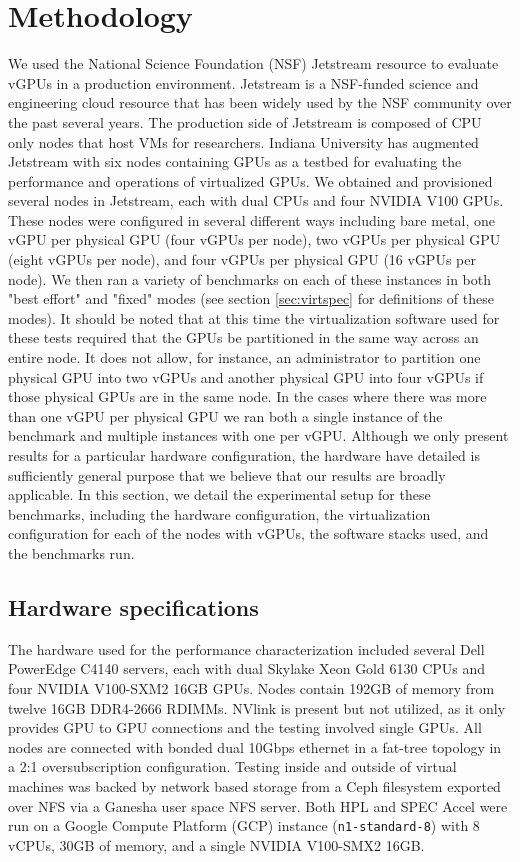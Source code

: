 \documentclass[acmtog, authorversion]{acmart}
\begin{document}
\section{Methodology} \label{sec:method}
We used the National Science Foundation (NSF) Jetstream resource \cite{jetstream1, jetstream2} to evaluate vGPUs in a production environment. Jetstream is a NSF-funded science and engineering cloud resource that has been widely used by the NSF community over the past several years. The production side of Jetstream is composed of CPU only nodes that host VMs for researchers. Indiana University has augmented Jetstream with six nodes containing GPUs as a testbed for evaluating the performance and operations of virtualized GPUs. We obtained and provisioned several nodes in Jetstream, each with dual CPUs and four NVIDIA V100 GPUs. These nodes were configured in several different ways including bare metal, one vGPU per physical GPU (four vGPUs per node), two vGPUs per physical GPU (eight vGPUs per node), and four vGPUs per physical GPU (16 vGPUs per node). We then ran a variety of benchmarks on each of these instances in both "best effort" and "fixed" modes (see section \ref{sec:virtspec} for definitions of these modes). It should be noted that at this time the virtualization software used for these tests required that the GPUs be partitioned in the same way across an entire node. It does not allow, for instance, an administrator to partition one physical GPU into two vGPUs and another physical GPU into four vGPUs if those physical GPUs are in the same node. In the cases where there was more than one vGPU per physical GPU we ran both a single instance of the benchmark and multiple instances with one per vGPU. Although we only present results for a particular hardware configuration, the hardware have detailed is sufficiently general purpose that we believe that our results are broadly applicable. In this section, we detail the experimental setup for these benchmarks, including the hardware configuration, the virtualization configuration for each of the nodes with vGPUs, the software stacks used, and the benchmarks run.

\subsection{Hardware specifications}\label{sec:hardspec}
The hardware used for the performance characterization included several Dell PowerEdge C4140 servers, each with dual Skylake Xeon Gold 6130 \cite{skylake} CPUs and four NVIDIA V100-SXM2 16GB \cite{v100-specs} GPUs. Nodes contain 192GB of memory from twelve 16GB DDR4-2666 RDIMMs. NVlink is present but not utilized, as it only provides GPU to GPU connections and the testing involved single GPUs. All nodes are connected with bonded dual 10Gbps ethernet in a fat-tree topology in a 2:1 oversubscription configuration. Testing inside and outside of virtual machines was backed by network based storage from a Ceph filesystem exported over NFS via a Ganesha user space NFS server. Both HPL and SPEC Accel were run on a Google Compute Platform (GCP) instance ({\tt n1-standard-8}) with 8 vCPUs, 30GB of memory, and a single NVIDIA V100-SMX2 16GB.
\end{document}

